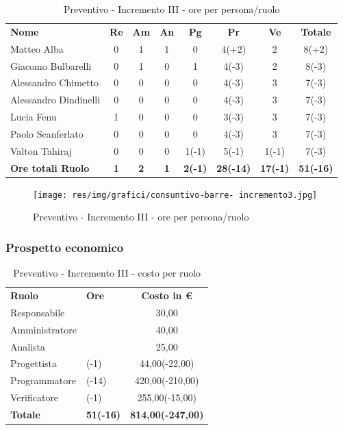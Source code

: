 \begin{table} [h!]
	\begin{center}
		\begin{tabular} { m{3.5cm} c c c c c c c }
			\rowcolor{lightgray}
			\textbf{Nome} & \textbf{Re} & \textbf{Am} & \textbf{An} & \textbf{Pg} & \textbf{Pr} & \textbf{Ve} & \textbf{Totale} \\
			Matteo Alba & 0 & 1 & 1 & 0 & 4(+2) & 2 & 8(+2) \\
			Giacomo Bulbarelli & 0 & 1 & 0 & 1 & 4(-3) & 2 & 8(-3) \\
			Alessandro Chimetto & 0 & 0 & 0 & 0 & 4(-3) & 3 & 7(-3)\\
			Alessandro Dindinelli & 0 & 0 & 0 & 0 & 4(-3) & 3 & 7(-3) \\
			Lucia Fenu & 1 & 0 & 0 & 0 & 3(-3) & 3 & 7(-3) \\
			Paolo Scanferlato & 0 & 0 & 0 & 0 & 4(-3) & 3 & 7(-3) \\
			Valton Tahiraj & 0 & 0 & 0 & 1(-1) & 5(-1) & 1(-1) & 7(-3) \\
			\textbf{Ore totali Ruolo} & \textbf{1} & \textbf{2} & \textbf{1} & \textbf{2(-1)} & \textbf{28(-14)}& \textbf{17(-1)} & \textbf{51(-16)}
		\end{tabular}
		\caption{Preventivo - Incremento III - ore per persona/ruolo}
	\end{center}
\end{table}
\begin{figure} [h!]
	\centering
	\texttt{[image: res/img/grafici/consuntivo-barre- incremento3.jpg]}
	\caption{Preventivo - Incremento III - ore per persona/ruolo} 
\end{figure}

\newpage

\subsubsection{Prospetto economico}
\begin{table} [h!] %
	\begin{center}
		\begin{tabular} { m{3cm} >{\centering}m{1.5cm} c }
			\rowcolor{lightgray}
			\textbf{Ruolo} & \textbf{Ore} & \textbf{Costo in \euro} \\
			Responsabile & 1 & 30,00 \\
			Amministratore & 2 & 40,00 \\
			Analista & 1 & 25,00 \\
			Progettista & 2(-1) & 44,00(-22,00) \\
			Programmatore & 28(-14) & 420,00(-210,00) \\
			Verificatore & 17(-1)& 255,00(-15,00) \\
			\textbf{Totale} & \textbf{51(-16)} & \textbf{814,00(-247,00)} \\
		\end{tabular}
		\caption{Preventivo - Incremento III - costo per ruolo}
	\end{center}
\end{table}

